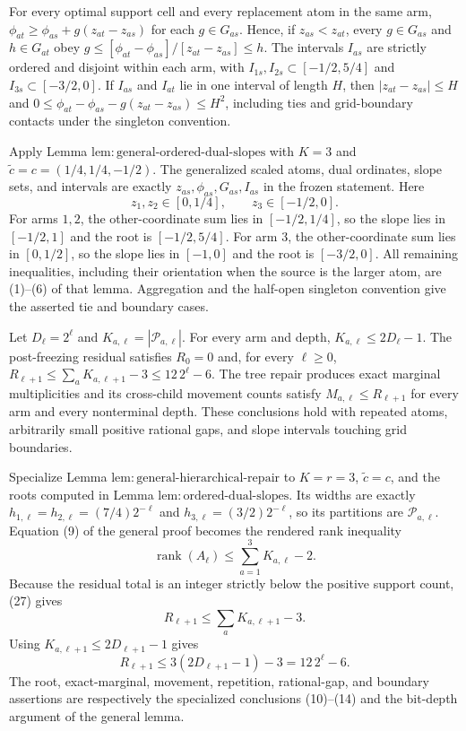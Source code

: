 For every optimal support cell and every replacement atom in the same arm, \(\phi_{at}\ge\phi_{as}+g(z_{at}-z_{as})\) for each \(g\in G_{as}\).  Hence, if \(z_{as}<z_{at}\), every \(g\in G_{as}\) and \(h\in G_{at}\) obey \(g\le[\phi_{at}-\phi_{as}]/[z_{at}-z_{as}]\le h\).  The intervals \(I_{as}\) are strictly ordered and disjoint within each arm, with \(I_{1s},I_{2s}\subset[-1/2,5/4]\) and \(I_{3s}\subset[-3/2,0]\).  If \(I_{as}\) and \(I_{at}\) lie in one interval of length \(H\), then \(|z_{at}-z_{as}|\le H\) and \(0\le\phi_{at}-\phi_{as}-g(z_{at}-z_{as})\le H^2\), including ties and grid-boundary contacts under the singleton convention.

Apply Lemma \(\mathrm{lem{:}general\mbox{-}ordered\mbox{-}dual\mbox{-}slopes}\) with \(K=3\) and \(\widetilde c=c=(1/4,1/4,-1/2)\).  The generalized scaled atoms, dual ordinates, slope sets, and intervals are exactly \(z_{as},\phi_{as},G_{as},I_{as}\) in the frozen statement.  Here
\[
 z_1,z_2\in[0,1/4],\qquad z_3\in[-1/2,0].
\]
For arms \(1,2\), the other-coordinate sum lies in \([-1/2,1/4]\), so the slope lies in \([-1/2,1]\) and the root is \([-1/2,5/4]\).  For arm \(3\), the other-coordinate sum lies in \([0,1/2]\), so the slope lies in \([-1,0]\) and the root is \([-3/2,0]\).  All remaining inequalities, including their orientation when the source is the larger atom, are (1)--(6) of that lemma.  Aggregation and the half-open singleton convention give the asserted tie and boundary cases.

Let \(D_\ell=2^\ell\) and \(K_{a,\ell}=|\mathcal P_{a,\ell}|\).  For every arm and depth, \(K_{a,\ell}\le2D_\ell-1\).  The post-freezing residual satisfies \(R_0=0\) and, for every \(\ell\ge0\), \(R_{\ell+1}\le\sum_aK_{a,\ell+1}-3\le12\,2^\ell-6\).  The tree repair produces exact marginal multiplicities and its cross-child movement counts satisfy \(M_{a,\ell}\le R_{\ell+1}\) for every arm and every nonterminal depth.  These conclusions hold with repeated atoms, arbitrarily small positive rational gaps, and slope intervals touching grid boundaries.

Specialize Lemma \(\mathrm{lem{:}general\mbox{-}hierarchical\mbox{-}repair}\) to \(K=r=3\), \(\widetilde c=c\), and the roots computed in Lemma \(\mathrm{lem{:}ordered\mbox{-}dual\mbox{-}slopes}\).  Its widths are exactly \(h_{1,\ell}=h_{2,\ell}=(7/4)2^{-\ell}\) and \(h_{3,\ell}=(3/2)2^{-\ell}\), so its partitions are \(\mathcal P_{a,\ell}\).  Equation (9) of the general proof becomes the rendered rank inequality
\[
 \operatorname{rank}(A_\ell)\le\sum_{a=1}^3K_{a,\ell}-2. \tag{27}
\]
Because the residual total is an integer strictly below the positive support count, (27) gives
\[
 R_{\ell+1}\le\sum_aK_{a,\ell+1}-3. \tag{28}
\]
Using \(K_{a,\ell+1}\le2D_{\ell+1}-1\) gives
\[
 R_{\ell+1}\le3(2D_{\ell+1}-1)-3
 =12\,2^\ell-6. \tag{29}
\]
The root, exact-marginal, movement, repetition, rational-gap, and boundary assertions are respectively the specialized conclusions (10)--(14) and the bit-depth argument of the general lemma.

